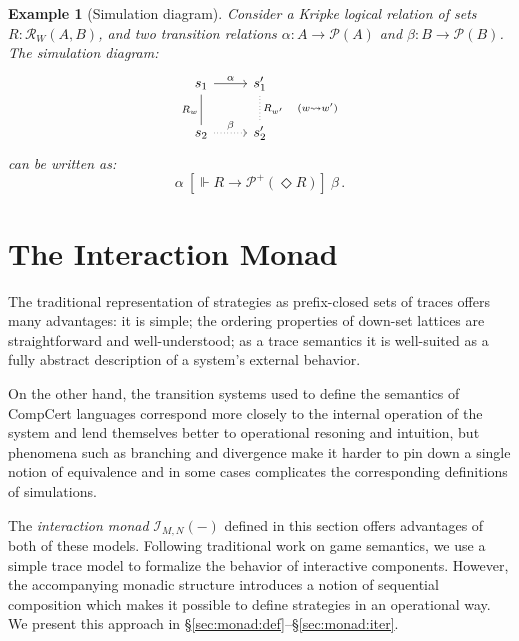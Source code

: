 \documentclass{article}
\newtheorem{example}{Example}
\newcommand{\ifr}[1]{\ [{#1}]\ }
\begin{document}
\begin{example}[Simulation diagram]
\label{ex:sim}
Consider a Kripke logical relation of sets $R : \mathcal{R}_W(A, B)$,
and two transition relations $\alpha : A \rightarrow \mathcal{P}(A)$
and $\beta : B \rightarrow \mathcal{P}(B)$.
The simulation diagram:
\[
  \begin{tikzcd}
    s_1 \arrow[r, "\alpha"]
        \arrow[d, dash, "R_w"'] &
    s_1' \arrow[d, dotted, dash, "R_{w'} \quad (w \leadsto w')"] \\
    s_2 \arrow[r, dotted, "\beta"] &
    s_2'
  \end{tikzcd}
\]
can be written as:
\[
  \alpha \ifr{\Vdash R \rightarrow \mathcal{P}^+(\Diamond R)} \beta \,.
\]
\end{example}




\section{The Interaction Monad} \label{sec:monad} %


The traditional representation of strategies as
prefix-closed sets of traces
offers many advantages:
it is simple;
the ordering properties of down-set lattices
are straightforward and well-understood;
as a trace semantics
it is well-suited as a fully abstract description
of a system's external behavior.

On the other hand,
the transition systems
used to define the semantics of CompCert languages
correspond more closely to the internal operation of the system
and lend themselves better
to operational resoning and intuition,
but phenomena such as branching and divergence
make it harder to pin down a single notion of equivalence \cite{blts}
and in some cases complicates the corresponding definitions of simulations.

The \emph{interaction monad} $\mathcal{I}_{M,N}(-)$
defined in this section offers advantages of both of these models.
Following traditional work on game semantics,
we use a simple trace model to formalize
the behavior of interactive components.
However,
the accompanying monadic structure
introduces a notion of sequential composition
which makes it possible to define strategies
in an operational way.
We present this approach in \S\ref{sec:monad:def}--\S\ref{sec:monad:iter}.
\end{document}
